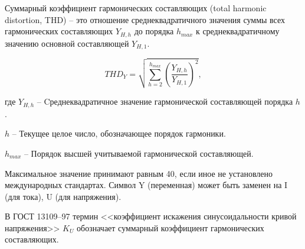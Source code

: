 Суммарный коэффициент гармонических составляющих (total harmonic distortion, THD) -- это отношение среднеквадратичного значения суммы всех гармонических составляющих $Y_{H,h}$ до порядка $h_{max}$ к среднеквадратичному значению основной составляющей $Y_{H,1}$.

\begin{equation}
	\label{eq:$THD_Y$}
	THD_Y = \sqrt{\sum_{h=2}^{h_{max}}\left( \frac{Y_{H,h}}{Y_{H,1}}\right) ^2},
\end{equation}

где ${Y_{H,h}}$ -- Cреднеквадратичное значение гармонической составляющей порядка $h$.

$h$ -- Текущее целое число, обозначающее порядок гармоники.

${h_{max}}$ -- Порядок высшей учитываемой гармонической составляющей.  

Максимальное значение принимают равным 40, если иное не установлено международных стандартах. Символ Y (переменная) может быть заменен на I (для тока), U (для напряжения). 

В ГОСТ 13109--97 термин <<коэффициент искажения синусоидальности кривой напряжения>> $K_U$ обозначает суммарный коэффициент гармонических составляющих.

